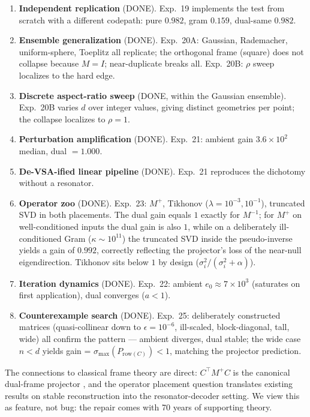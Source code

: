 \documentclass[11pt,a4paper]{article}
\begin{document}
\begin{enumerate}
\item \textbf{Independent replication} (DONE). Exp.~19 implements the test from scratch with a different codepath: pure $0.982$, gram $0.159$, dual-same $0.982$.
\item \textbf{Ensemble generalization} (DONE). Exp.~20A: Gaussian, Rademacher, uniform-sphere, Toeplitz all replicate; the orthogonal frame (square) does not collapse because $M=I$; near-duplicate breaks all. Exp.~20B: $\rho$ sweep localizes to the hard edge.
\item \textbf{Discrete aspect-ratio sweep} (DONE, within the Gaussian ensemble). Exp.~20B varies $d$ over integer values, giving distinct geometries per point; the collapse localizes to $\rho=1$.
\item \textbf{Perturbation amplification} (DONE). Exp.~21: ambient gain $3.6\times 10^{2}$ median, dual $=1.000$.
\item \textbf{De-VSA-ified linear pipeline} (DONE). Exp.~21 reproduces the dichotomy without a resonator.
\item \textbf{Operator zoo} (DONE). Exp.~23: $M^{+}$, Tikhonov ($\lambda=10^{-3}, 10^{-1}$), truncated SVD in both placements. The dual gain equals $1$ exactly for $M^{-1}$; for $M^{+}$ on well-conditioned inputs the dual gain is also $1$, while on a deliberately ill-conditioned Gram ($\kappa \sim 10^{11}$) the truncated SVD inside the pseudo-inverse yields a gain of $0.992$, correctly reflecting the projector's loss of the near-null eigendirection. Tikhonov sits below $1$ by design ($\sigma_i^2/(\sigma_i^2+\alpha)$).
\item \textbf{Iteration dynamics} (DONE). Exp.~22: ambient $e_0 \approx 7\times 10^{3}$ (saturates on first application), dual converges ($a < 1$).
\item \textbf{Counterexample search} (DONE). Exp.~25: deliberately constructed matrices (quasi-collinear down to $\epsilon=10^{-6}$, ill-scaled, block-diagonal, tall, wide) all confirm the pattern --- ambient diverges, dual stable; the wide case $n<d$ yields gain = $\sigma_{\max}(P_{\mathrm{row}(C)}) < 1$, matching the projector prediction.
\end{enumerate}

The connections to classical frame theory are direct: $C^{\top} M^{+} C$ is the canonical dual-frame projector \citep{duffin1952class}, and the operator placement question translates existing results on stable reconstruction \citep{eldar2018sampling} into the resonator-decoder setting. We view this as feature, not bug: the repair comes with 70 years of supporting theory.
\end{document}

